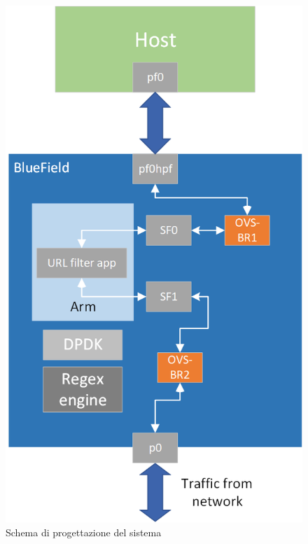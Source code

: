 \documentclass[binding=0.6cm]{sapthesis}
\theoremstyle{definition}
\begin{document}
\begin{figure}[h]
    \centering
    \includegraphics[scale=0.48]{system-design-diagram-url-filter.png}
    \caption{Schema di progettazione del sistema}
    \label{fig:ovs}
\end{figure}

\end{document}
